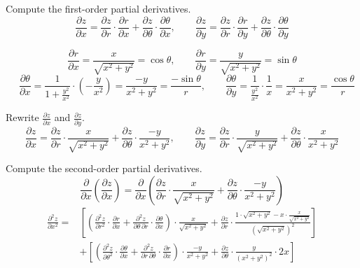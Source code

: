 \documentclass[a4paper, 12pt]{article}
\begin{document}
\begin{enumerate}[leftmargin=*,label=\textbf{\arabic*.}]
Compute the first-order partial derivatives.
\[\frac{\partial z}{\partial x}=\frac{\partial z}{\partial r}\cdot\frac{\partial r}{\partial x}+\frac{\partial z}{\partial \theta}\cdot\frac{\partial\theta}{\partial x},\quad\quad\frac{\partial z}{\partial y}=\frac{\partial z}{\partial r}\cdot\frac{\partial r}{\partial y} + \frac{\partial z}{\partial\theta}\cdot\frac{\partial\theta}{\partial y}\]

\vspace{-1em}
\[\frac{\partial r}{\partial x}=\frac{x}{\sqrt{x^2+y^2}}=\cos\theta,\quad\quad\frac{\partial r}{\partial y}=\frac{y}{\sqrt{x^2+y^2}}=\sin\theta\]
\[\quad\frac{\partial\theta}{\partial x}=\frac{1}{1+\frac{y^2}{x^2}}\cdot \left(-\frac{y}{x^2}\right)=\frac{-y}{x^2+y^2}=\frac{-\sin\theta}{r},\quad\quad\frac{\partial\theta}{\partial y}=\frac{1}{\frac{y^2}{x^2}}\cdot\frac{1}{x}=\frac{x}{x^2+y^2}=\frac{\cos\theta}{r}\]

Rewrite $\displaystyle\frac{\partial z}{\partial x}$ and $\displaystyle\frac{\partial z}{\partial y}$.
\[\frac{\partial z}{\partial x}=\frac{\partial z}{\partial r}\cdot\frac{x}{\sqrt{x^2+y^2}}+\frac{\partial z}{\partial\theta}\cdot\frac{-y}{x^2+y^2},\quad\quad\frac{\partial z}{\partial y}=\frac{\partial z}{\partial r}\cdot\frac{y}{\sqrt{x^2+y^2}}+\frac{\partial z}{\partial \theta}\cdot\frac{x}{x^2+y^2}\]

Compute the second-order partial derivatives.
\[\frac{\partial}{\partial x}\left(\frac{\partial z}{\partial x}\right)=\frac{\partial}{\partial x}\left(\frac{\partial z}{\partial r}\cdot\frac{x}{\sqrt{x^2+y^2}}+\frac{\partial z}{\partial\theta}\cdot\frac{-y}{x^2+y^2}\right)\]
\vspace{-1em}
\begin{align*}\frac{\partial^2z}{\partial x^2}=&\left[\left(\frac{\partial^2z}{\partial r^2}\cdot\frac{\partial r}{\partial x}+\frac{\partial^2 z}{\partial\theta\,\partial r}\cdot\frac{\partial\theta}{\partial x}\right)\cdot\frac{x}{\sqrt{x^2+y^2}}+\frac{\partial z}{\partial r}\cdot\frac{1\cdot\sqrt{x^2+y^2}-x\cdot\frac{x}{\sqrt{x^2+y^2}}}{\left(\sqrt{x^2+y^2}\right)^2}\right]\\[1em]&+\left[\left(\frac{\partial^2z}{\partial \theta^2}\cdot\frac{\partial \theta}{\partial x}+\frac{\partial^2 z}{\partial r\,\partial \theta}\cdot\frac{\partial r}{\partial x}\right)\cdot\frac{-y}{x^2+y^2}+\frac{\partial z}{\partial\theta}\cdot\frac{y}{(x^2+y^2)^2}\cdot2x\right]\end{align*}


\end{enumerate}
\end{document}
